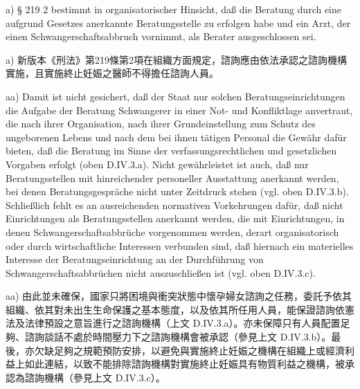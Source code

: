 \documentclass[12pt]{article}
\begin{document}
\begin{sourcepara}[title={原文E.169}]
a) § 219 \abbrAbs{} 2 \abbrStGB{} \abbrNF{} bestimmt in organisatorischer Hinsicht, daß die Beratung durch eine aufgrund Gesetzes anerkannte Beratungsstelle zu erfolgen habe und ein Arzt, der einen Schwangerschaftsabbruch vornimmt, als Berater ausgeschlossen sei.
\end{sourcepara}
\begin{transpara}
a) 新版本《刑法》第219條第2項在組織方面規定，諮詢應由依法承認之諮詢機構實施，且實施終止妊娠之醫師不得擔任諮詢人員。
\end{transpara}

\begin{sourcepara}[title={原文E.170}]
aa) Damit ist nicht gesichert, daß der Staat nur solchen Beratungseinrichtungen die Aufgabe der Beratung Schwangerer in einer Not- und Konfliktlage anvertraut, die nach ihrer Organisation, nach ihrer Grundeinstellung zum Schutz des ungeborenen Lebens und nach dem bei ihnen tätigen Personal die Gewähr dafür bieten, daß die Beratung im Sinne der verfassungsrechtlichen und gesetzlichen Vorgaben erfolgt (oben D.IV.3.a). Nicht gewährleistet ist auch, daß nur Beratungsstellen mit hinreichender personeller Ausstattung anerkannt werden, bei denen Beratungsgespräche nicht unter Zeitdruck stehen (vgl. oben D.IV.3.b). Schließlich fehlt es an ausreichenden normativen Vorkehrungen dafür, daß nicht Einrichtungen als Beratungsstellen anerkannt werden, die mit Einrichtungen, in denen Schwangerschaftsabbrüche vorgenommen werden, derart organisatorisch oder durch wirtschaftliche Interessen verbunden sind, daß hiernach ein materielles Interesse der Beratungseinrichtung an der Durchführung von Schwangerschaftsabbrüchen nicht auszuschließen ist (vgl. oben D.IV.3.c).
\end{sourcepara}
\begin{transpara}
aa) 由此並未確保，國家只將困境與衝突狀態中懷孕婦女諮詢之任務，委託予依其組織、依其對未出生生命保護之基本態度，以及依其所任用人員，能保證諮詢依憲法及法律預設之意旨進行之諮詢機構（上文 D.IV.3.a）。亦未保障只有人員配置足夠、諮詢談話不處於時間壓力下之諮詢機構會被承認（參見上文 D.IV.3.b）。最後，亦欠缺足夠之規範預防安排，以避免與實施終止妊娠之機構在組織上或經濟利益上如此連結，以致不能排除諮詢機構對實施終止妊娠具有物質利益之機構，被承認為諮詢機構（參見上文 D.IV.3.c）。
\end{transpara}
\end{document}
